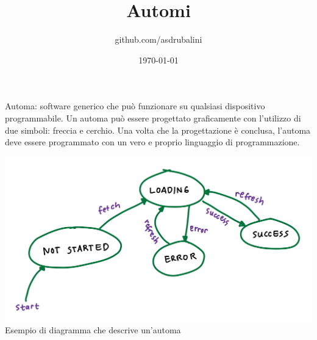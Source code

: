 \documentclass{article}
\title{Automi}
\author{github.com/asdrubalini}
\date{\today}
\begin{document}
    \maketitle

    Automa: software generico che può funzionare su qualsiasi dispositivo programmabile.
    Un automa può essere progettato graficamente con l'utilizzo di due simboli: freccia e cerchio.
    Una volta che la progettazione è conclusa, l'automa deve essere programmato con un vero e proprio linguaggio di programmazione.

    \begin{center}
        \includegraphics[width=\textwidth]{automa.png}
        Esempio di diagramma che descrive un'automa
    \end{center}
\end{document}
